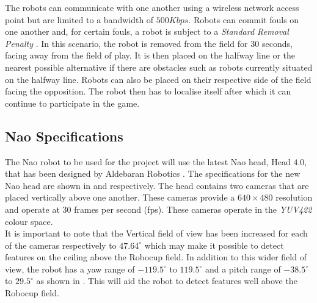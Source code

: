 \documentclass{report}
\begin{document}
The robots can communicate with one another using a wireless network access point but are limited to a bandwidth of $500 Kbps$. Robots can commit fouls on one another and, for certain fouls, a robot is subject to a \textit{Standard Removal Penalty} \cite{Rules}. In this scenario, the robot is removed from the field for $30$ seconds, facing away from the field of play. It is then placed on the halfway line or the nearest possible alternative if there are obstacles such as robots currently situated on the halfway line. Robots can also be placed on their respective side of the field facing the opposition. The robot then has to localise itself after which it can continue to participate in the game.\\

\subsection{Nao Specifications}
\label{sec:naoSpecs}
The Nao robot to be used for the project will use the latest Nao head, Head $4.0$, that has been designed by Aldebaran Robotics \cite{NaoHead}. The specifications for the new Nao head are shown in  and  respectively. The head contains two cameras that are placed vertically above one another. These cameras provide a $640 \times 480$ resolution and operate at $30$ frames per second (fps). These cameras operate in the \textit{YUV422} colour space.\\

It is important to note that the Vertical field of view has been increased for each of the cameras respectively to $47.64^\circ$ which may make it possible to detect features on the ceiling above the Robocup field. In addition to this wider field of view, the robot has a yaw range of $-119.5^\circ$ to $119.5^\circ$ and a pitch range of $-38.5^\circ$ to $29.5^\circ$ as shown in . This will aid the robot to detect features well above the Robocup field.\\ 
\end{document}
